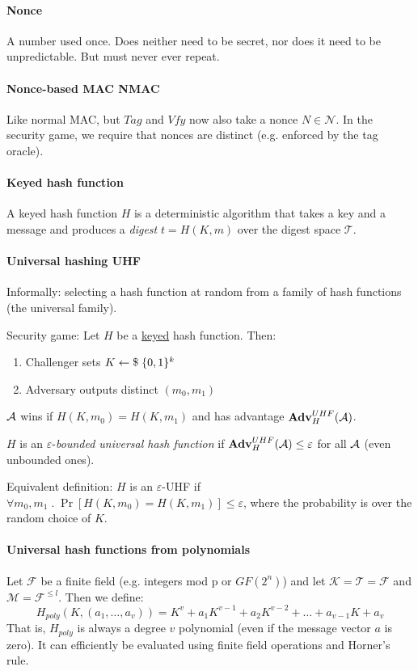 \paragraph{Nonce}
A number used once.
Does neither need to be secret, nor does it need to be unpredictable.
But must never ever repeat.

\paragraph{Nonce-based MAC NMAC}
Like normal MAC, but $Tag$ and $Vfy$ now also take a nonce $N \in \mathcal{N}$.
In the security game, we require that nonces are distinct (e.g. enforced by the tag oracle).

\paragraph{Keyed hash function}
A keyed hash function $H$ is a deterministic algorithm that takes a key and a message and produces a \emph{digest} $t=H(K, m)$ over the digest space $\mathcal{T}$.

\paragraph{Universal hashing UHF}
Informally: selecting a hash function at random from a family of hash functions (the universal family).

Security game:
Let $H$ be a \underline{keyed} hash function. Then:
\begin{enumerate}
\item Challenger sets $K \leftarrow \$ \; \lbrace 0, 1 \rbrace^k$
\item Adversary outputs distinct $(m_0, m_1)$
\end{enumerate}
$\mathcal{A}$ wins if $H(K, m_0) = H(K, m_1)$ and has advantage $\mathbf{Adv}^{UHF}_{H}(\mathcal{A})$.

$H$ is an $\varepsilon$-\emph{bounded universal hash function} if $\mathbf{Adv}^{UHF}_{H}(\mathcal{A}) \leq \varepsilon$ for all $\mathcal{A}$ (even unbounded ones).

Equivalent definition:
$H$ is an $\varepsilon$-UHF if
$ \forall m_0, m_1 \; . \; \Pr[H(K, m_0) = H(K, m_1)] \leq \varepsilon $,
where the probability is over the random choice of $K$.

\paragraph{Universal hash functions from polynomials}
Let $\mathcal{F}$ be a finite field (e.g. integers mod p or $GF(2^n)$)
and let $\mathcal{K} = \mathcal{T} = \mathcal{F}$ and $\mathcal{M} = \mathcal{F}^{\leq l}$.
Then we define:
$$
H_{poly}(K, (a_1, \dots, a_v))
= K^v + a_1 K^{v-1} + a_2 K^{v-2} + \dots + a_{v-1} K + a_v
$$
That is, $H_{poly}$ is always a degree $v$ polynomial (even if the message vector $a$ is zero).
It can efficiently be evaluated using finite field operations and Horner's rule.

